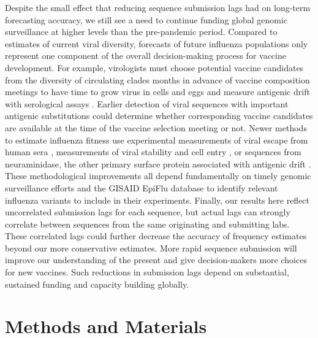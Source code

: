 \documentclass[9pt,lineno]{elife}
\begin{document}
Despite the small effect that reducing sequence submission lags had on long-term forecasting accuracy, we still see a need to continue funding global genomic surveillance at higher levels than the pre-pandemic period.
Compared to estimates of current viral diversity, forecasts of future influenza populations only represent one component of the overall decision-making process for vaccine development.
For example, virologists must choose potential vaccine candidates from the diversity of circulating clades months in advance of vaccine composition meetings to have time to grow virus in cells and eggs and measure antigenic drift with serological assays \citep{Morris2018,Loes2024}.
Earlier detection of viral sequences with important antigenic substitutions could determine whether corresponding vaccine candidates are available at the time of the vaccine selection meeting or not.
Newer methods to estimate influenza fitness use experimental measurements of viral escape from human sera \citep{Lee2019,Welsh2023,Meijers2025,Kikawa2025}, measurements of viral stability and cell entry \citep{Yu2025}, or sequences from neuraminidase, the other primary surface protein associated with antigenic drift \citep{Meijers2025}.
These methodological improvements all depend fundamentally on timely genomic surveillance efforts and the GISAID EpiFlu database to identify relevant influenza variants to include in their experiments.
Finally, our results here reflect uncorrelated submission lags for each sequence, but actual lags can strongly correlate between sequences from the same originating and submitting labs.
These correlated lags could further decrease the accuracy of frequency estimates beyond our more conservative estimates.
More rapid sequence submission will improve our understanding of the present and give decision-makers more choices for new vaccines.
Such reductions in submission lags depend on substantial, sustained funding and capacity building globally.


\section{Methods and Materials}
\end{document}
